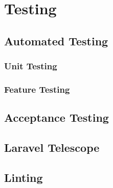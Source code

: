 \chapter{Testing}

\section{Automated Testing}

\subsection{Unit Testing}

\subsection{Feature Testing}

\section{Acceptance Testing}

\section{Laravel Telescope}

\section{Linting}
